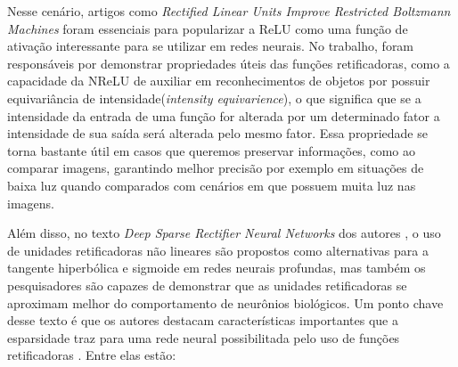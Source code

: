 Nesse cenário, artigos como \textit{Rectified Linear Units Improve Restricted Boltzmann Machines} foram essenciais para popularizar a ReLU como uma função de ativação interessante para se utilizar em redes neurais. No trabalho, \textcite{Nair2010} foram responsáveis por demonstrar propriedades úteis das funções retificadoras, como a capacidade da NReLU de auxiliar em reconhecimentos de objetos por possuir equivariância de intensidade(\textit{intensity equivarience}), o que significa que se a intensidade da entrada de uma função for alterada por um determinado fator a intensidade de sua saída será alterada pelo mesmo fator. Essa propriedade se torna bastante útil em casos que queremos preservar informações, como ao comparar imagens, garantindo melhor precisão por exemplo em situações de baixa luz quando comparados com cenários em que possuem muita luz nas imagens.

Além disso, no texto \textit{Deep Sparse Rectifier Neural Networks} dos autores \textcite{Glorot}, o uso de unidades retificadoras não lineares são propostos como alternativas para a tangente hiperbólica e sigmoide em redes neurais profundas, mas também os pesquisadores são capazes de demonstrar que as unidades retificadoras se aproximam melhor do comportamento de neurônios biológicos. Um ponto chave desse texto é que os autores destacam características importantes que a esparsidade traz para uma rede neural possibilitada pelo uso de funções retificadoras \parencite{Glorot}. Entre elas estão:


